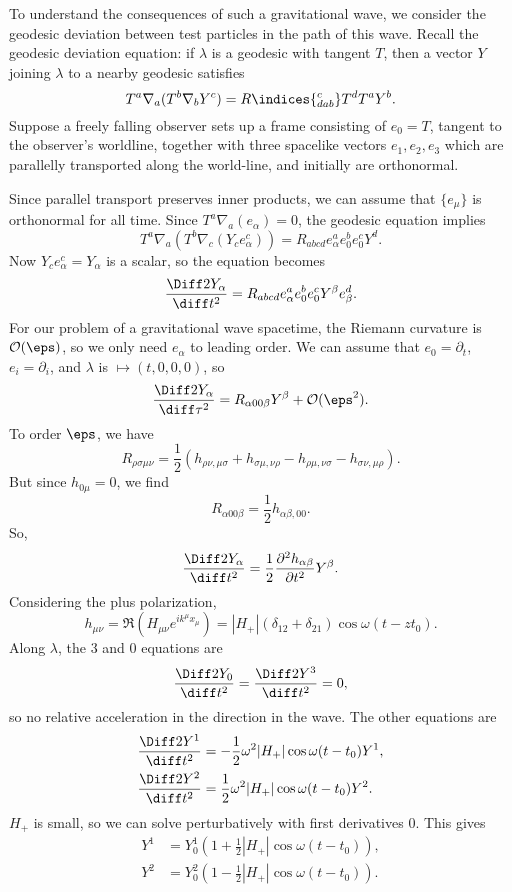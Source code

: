\documentclass[12pt]{article}
\begin{document}
To understand the consequences of such a gravitational wave, we consider the geodesic deviation between test particles in the path of this wave. Recall the geodesic deviation equation: if $\lambda$ is a geodesic with tangent $T$, then a vector $Y$ joining $\lambda$ to a nearby geodesic satisfies
\[
	T^a \nabla_a (T^b \nabla_b Y^c) = R\indices{^{c}_{dab}} T^d T^a Y^b.
\]
Suppose a freely falling observer sets up a frame consisting of $e_0 = T$, tangent to the observer's worldline, together with three spacelike vectors $e_1, e_2, e_3$ which are parallelly transported along the world-line, and initially are orthonormal.

Since parallel transport preserves inner products, we can assume that $\{e_\mu\}$ is orthonormal for all time. Since $T^a \nabla_a (e_\alpha) = 0$, the geodesic equation implies
\[
	T^a \nabla_a(T^b \nabla_c (Y_c e^c_\alpha)) = R_{abcd} e^a_\alpha e^b_0 e^c_0 Y^d.
\]
Now $Y_c e^c_\alpha = Y_\alpha$ is a scalar, so the equation becomes
\[
	\frac{\Diff2 Y_\alpha}{\diff t^2} = R_{abcd} e^a_\alpha e^b_0 e^c_0 Y^{\beta} e^d_\beta.
\]
For our problem of a gravitational wave spacetime, the Riemann curvature is $\mathcal{O}(\eps)$, so we only need $e_\alpha$ to leading order. We can assume that $e_0 = \partial_t$, $e_i = \partial_i$, and  $\lambda$ is $ \mapsto (t, 0, 0, 0)$, so
\[
	\frac{\Diff 2 Y_\alpha}{\diff \tau^2} = R_{\alpha00\beta}Y^\beta + \mathcal{O}(\eps^2).
\]
To order $\eps$, we have
\[
R_{\rho\sigma\mu\nu} = \frac{1}{2} \left( h_{\rho\nu,\mu\sigma} + h_{\sigma\mu,\nu\rho} - h_{\rho\mu,\nu\sigma} - h_{\sigma\nu,\mu\rho}\right).
\]
But since $h_{0\mu} = 0$, we find
\[
R_{\alpha00\beta} = \frac{1}{2} h_{\alpha\beta,00}.
\]
So,
\[
	\frac{\Diff 2 Y_\alpha}{\diff t^2} = \frac 12 \frac{\partial^2 h_{\alpha\beta}}{\partial t^2} Y^\beta.
\]
Considering the plus polarization,
\[
h_{\mu\nu} = \Re (H_{\mu\nu} e^{i k^\mu x_\mu}) = |H_+|(\delta_{12} + \delta_{21}) \cos \omega(t - z t_0).
\]
Along $\lambda$, the 3 and 0 equations are
\[
	\frac{\Diff 2 Y_0}{\diff t^2} = \frac{\Diff 2 Y^3}{\diff t^2} = 0,
\]
so no relative acceleration in the direction in the wave. The other equations are
\begin{align*}
	\frac{\Diff 2 Y^1}{\diff t^2} &= - \frac 12 \omega^2 |H_+| \cos \omega(t - t_0) Y^1, \\
	\frac{\Diff 2 Y^2}{\diff t^2} &= \frac 12 \omega^2 |H_+| \cos \omega(t - t_0) Y^2.
\end{align*}
$H_+$ is small, so we can solve perturbatively with first derivatives $0$. This gives
\begin{align*}
	Y^1 &= Y_0^1 \left( 1 + \frac 12 |H_+| \cos \omega (t - t_0) \right), \\
	Y^2 &= Y_0^2 \left(1 - \frac 12 |H_+| \cos \omega(t - t_0)\right).
\end{align*}
\end{document}
